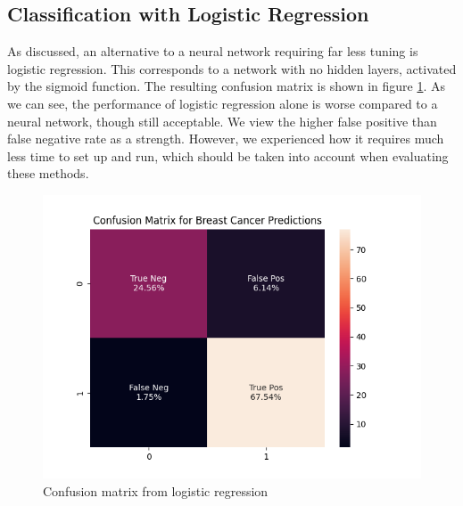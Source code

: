 \subsection{Classification with Logistic Regression}
As discussed, an alternative to a neural network requiring far less tuning is logistic regression. This corresponds to a network with no hidden layers, activated by the sigmoid function. The resulting confusion matrix is shown in figure \ref{fig:logreg}. As we can see, the performance of logistic regression alone is worse compared to a neural network, though still acceptable. We view the higher false positive than false negative rate as a strength. However, we experienced how it requires much less time to set up and run, which should be taken into account when evaluating these methods.
\begin{figure}
    \centering
    \includegraphics[width=\linewidth]{figures/confusionmatrix.png}
    \caption{Confusion matrix from logistic regression}
    \label{fig:logreg}
\end{figure}




